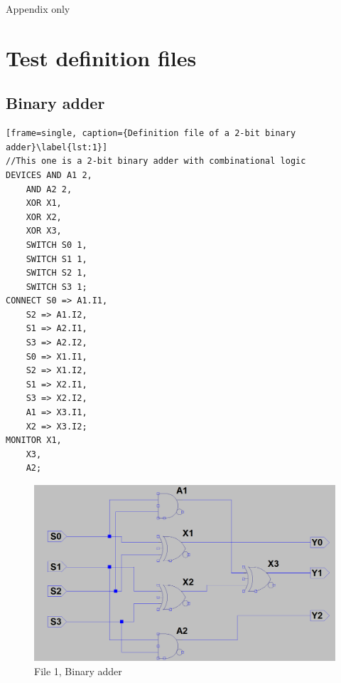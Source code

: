 \documentclass[12pt]{article}
\begin{document}
Appendix only

\appendix
\section{Test definition files}
\subsection{Binary adder}
\begin{lstfloat}[H]
\begin{lstlisting}[frame=single, caption={Definition file of a 2-bit binary adder}\label{lst:1}]
//This one is a 2-bit binary adder with combinational logic
DEVICES	AND A1 2,
	AND A2 2,
	XOR X1,
	XOR X2,
	XOR X3,
	SWITCH S0 1,
	SWITCH S1 1,
	SWITCH S2 1,
	SWITCH S3 1;
CONNECT	S0 => A1.I1,
	S2 => A1.I2,
	S1 => A2.I1,
	S3 => A2.I2,
	S0 => X1.I1,
	S2 => X1.I2,
	S1 => X2.I1,
	S3 => X2.I2,
	A1 => X3.I1,
	X2 => X3.I2;
MONITOR	X1,
	X3,
	A2;
\end{lstlisting}
\end{lstfloat}

\begin{figure}[H]
  \centering
  \includegraphics[width=0.9\linewidth]{figures/Test101.png}
  \captionsetup{width=.7\linewidth}
  \caption{File 1, Binary adder}
  \label{fig:1}
\end{figure}
\end{document}
